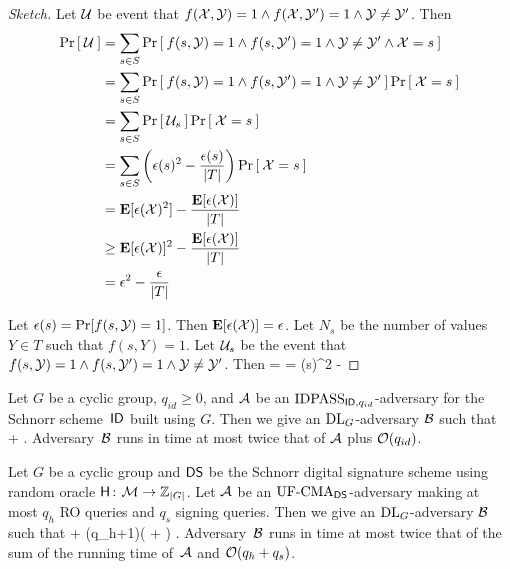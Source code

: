 \begin{proof}[Sketch]
Let ${\cal U}$ be event that $f({\cal X},{\cal Y}) = 1 \land f({\cal X},{\cal Y}') = 1 \land
{\cal Y} \ne {\cal Y}'$. Then 
\begin{align*}
  \Pr\left[\: {\cal U} \:\right] 
  & = \sum_{s \in S} \Pr\left[\: f(s,{\cal Y}) = 1 \land f(s,{\cal Y}') = 1 \land {\cal Y} \ne {\cal Y}' \land {\cal X} = s \:\right]\\
  & = \sum_{s \in S} \Pr\left[\: f(s,{\cal Y}) = 1 \land f(s,{\cal Y}') = 1 \land {\cal Y} \ne {\cal Y}' \:\right]\Pr\left[\: {\cal X} = s \:\right]\\
  & = \sum_{s \in S} \Pr\left[\: {\cal U}_s \:\right] \Pr\left[\: {\cal X} = s \:\right]\\
  & = \sum_{s \in S} \left(\epsilon(s)^2 - \frac{\epsilon(s)}{|T|}\right) \Pr\left[\: {\cal X} = s \:\right]\\
  & = {\textbf E}[\epsilon({\cal X})^2] - \frac{{\textbf E}[\epsilon({\cal X})]}{|T|}\\
  & \ge {\textbf E}[\epsilon({\cal X})]^2 - \frac{{\textbf E}[\epsilon({\cal X})]}{|T|}\\
  & = \epsilon^2 - \frac{\epsilon}{|T|}
\end{align*}

Let $\epsilon(s) = \Pr[f(s,{\cal Y}) = 1]$. 
Then ${\textbf E}[\epsilon({\cal X})] = \epsilon$. Let $N_s$ be the number of values
$Y \in T$ such that $f(s,Y) = 1$. Let ${\cal U}_s$ be the event that $f(s,{\cal Y}) =
1 \land f(s,{\cal Y}') = 1 \land {\cal Y} \ne {\cal Y}'$. Then
\bnm
   =  = \epsilon(s)^2 -  
\enm
\end{proof}




\begin{theorem*}
Let $G$ be a cyclic group, $q_{id} \ge 0$, 
and ${\mathcal A}$ be an $\textnormal{IDPASS}_{\textsf{ID},q_{id}}$-adversary for the Schnorr
scheme~$\textsf{ID}$
built using $G$. Then we give an $\textnormal{DL}_G$-adversary ${\mathcal B}$ such that
\bnm
   \le {} +  \;.
\enm
Adversary~${\mathcal B}$ runs in time at most twice that of ${\mathcal A}$ plus
${\cal O}(q_{id})$.
\end{theorem*}


\begin{theorem*}
Let $G$ be a cyclic group and ${\mathsf{DS}}$ be the Schnorr digital signature scheme
using random oracle $\mathsf{H} {{\kern .05em}\colon{\kern .05em}}{\cal M}\rightarrow{{\mathbb Z}}_{|G|}$.  
Let ${\mathcal A}$ be an $\textnormal{UF-CMA}_{{\mathsf{DS}}}$-adversary making at most $q_h$ RO queries and
$q_s$ signing queries.
Then we give an $\textnormal{DL}_G$-adversary ${\mathcal B}$ such that
\bnm
  \AdvUFCMA{\DS}{\advA} \le {} + (q_h+1)\left( + \right) \;.
\enm
Adversary~${\mathcal B}$ runs in time at most twice that of the sum of the running time
of~${\mathcal A}$ and ${\cal O}(q_h+q_s)$.
\end{theorem*}

